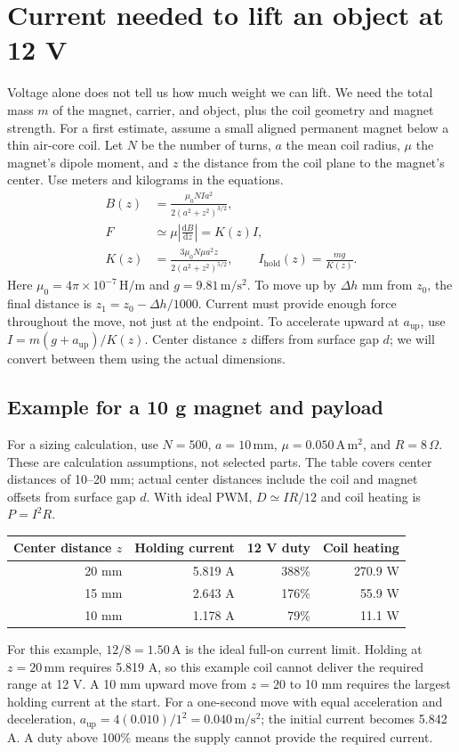 \documentclass[11pt,letterpaper]{article}
\begin{document}
\section{Current needed to lift an object at 12 V}
Voltage alone does not tell us how much weight we can lift. We need the
total mass \(m\) of the magnet, carrier, and object, plus the coil geometry
and magnet strength. For a first estimate, assume a small aligned permanent
magnet below a thin air-core coil. Let \(N\) be the number of turns, \(a\)
the mean coil radius, \(\mu\) the magnet's dipole moment, and \(z\) the
distance from the coil plane to the magnet's center. Use meters and
kilograms in the equations.
\begin{align}
 B(z)&=\frac{\mu_0NIa^2}{2(a^2+z^2)^{3/2}},\\
 F&\simeq\mu\left|\frac{\mathrm dB}{\mathrm dz}\right|=K(z)I,\\
 K(z)&=\frac{3\mu_0N\mu a^2z}{2(a^2+z^2)^{5/2}},\qquad
 I_{\mathrm{hold}}(z)=\frac{mg}{K(z)}.
\end{align}
Here \(\mu_0=4\pi\times10^{-7}\,\mathrm{H/m}\) and
\(g=9.81\,\mathrm{m/s^2}\). To move up by \(\Delta h\) mm from
\(z_0\), the final distance is \(z_1=z_0-\Delta h/1000\). Current must
provide enough force throughout the move, not just at the endpoint. To
accelerate upward at \(a_{\mathrm{up}}\), use
\(I=m(g+a_{\mathrm{up}})/K(z)\). Center distance \(z\) differs from
surface gap \(d\); we will convert between them using the actual dimensions.

\subsection{Example for a 10 g magnet and payload}
For a sizing calculation, use \(N=500\), \(a=10\,\mathrm{mm}\),
\(\mu=0.050\,\mathrm{A\,m^2}\), and \(R=8\,\Omega\). These are
calculation assumptions, not selected parts. The table covers center
distances of 10--20 mm; actual center distances include the coil and magnet
offsets from surface gap \(d\). With ideal PWM,
\(D\simeq IR/12\) and coil heating is \(P=I^2R\).
\begin{center}
\begin{tabular}{rrrr}
\toprule
Center distance \(z\) & Holding current & 12 V duty & Coil heating\\
\midrule
20 mm & 5.819 A & 388\% & 270.9 W\\
15 mm & 2.643 A & 176\% & 55.9 W\\
10 mm & 1.178 A & 79\% & 11.1 W\\
\bottomrule
\end{tabular}
\end{center}
For this example, \(12/8=1.50\,\mathrm A\) is the ideal full-on current
limit. Holding at \(z=20\,\mathrm{mm}\) requires 5.819 A, so this example
coil cannot deliver the required range at 12 V. A 10 mm upward move from
\(z=20\) to 10 mm requires the largest holding current at the start. For
a one-second move with equal acceleration and deceleration,
\(a_{\mathrm{up}}=4(0.010)/1^2=0.040\,\mathrm{m/s^2}\); the initial
current becomes 5.842 A. A duty above 100\% means the supply cannot provide
the required current.
\end{document}
